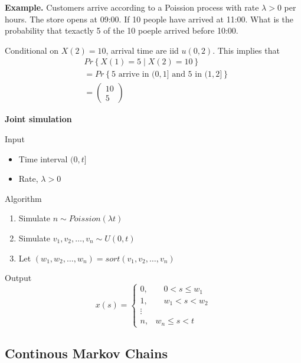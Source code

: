\documentclass{article}
\theoremstyle{remark}
\newcommand{\newpara}
  {
  \vskip 0.4cm
  }
\begin{document}
\begin{tcolorbox}
  \textbf{Example.} Customers arrive according to a Poission process with rate $\lambda  > 0$ per hours.  The store opens at 09:00. If 10 people have arrived at 11:00. What is the probability that texactly 5 of the 10 poeple arrived before 10:00.
  
  \newpara
  Conditional on $X\left( 2 \right) = 10$, arrival time are iid  $u\left( 0,2 \right)$. This implies that \[
    \begin{split}
     &  Pr \left \{ X\left( 1 \right)   = 5  \mid  X\left( 2 \right) = 10 \right \}  \\
   & = Pr \left \{ 5 \text{ arrive in } (0, 1] \text{ and }5 \text{ in } (1,2] \right \}  \\
   &= \begin{pmatrix}
   10 \\
   5
   \end{pmatrix} 
    \end{split} 
  \] 
\end{tcolorbox}

\textbf{Joint simulation} 

\newpara
Input
\begin{itemize}
  \item Time interval $(0, t]$
  \item Rate,  $\lambda  > 0$
\end{itemize}

Algorithm 
\begin{enumerate}[label=(\roman*)]
  \item Simulate $n \sim Poission \left( \lambda t \right)$
  \item Simulate $v_{1} , v_{2} , \ldots , v_{n} \sim U\left( 0,t \right)$
  \item Let $\left( w_{1}, w_{2}, \ldots, w_{n} \right) = sort \left( v_{1}, v_{2}, \ldots, v_{n} \right)$
\end{enumerate}

Output \[
  x\left( s \right) = 
\begin{cases}
  0, &  \quad  0< s \le w_{1}  \\
  1,  &  \quad w_{1} < s < w_{2} \\
  \vdots   &  \\
  n, &   w_{n} \le s < t
\end{cases}
\] 


\subsection{Continous Markov Chains}%
\label{sub:continous_markov_chains}
\end{document}
